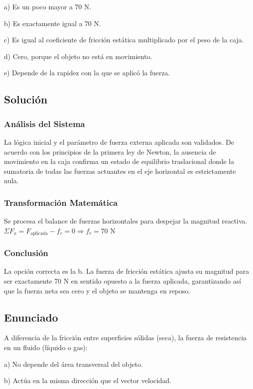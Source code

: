 \documentclass[12pt]{article}
\begin{document}
a) Es un poco mayor a 70 N.

b) Es exactamente igual a 70 N.

c) Es igual al coeficiente de fricción estática multiplicado por el peso de la caja.

d) Cero, porque el objeto no está en movimiento.

e) Depende de la rapidez con la que se aplicó la fuerza.

\subsection*{Solución}

\subsubsection*{Análisis del Sistema}
La lógica inicial y el parámetro de fuerza externa aplicada son validados. De acuerdo con los principios de la primera ley de Newton, la ausencia de movimiento en la caja confirma un estado de equilibrio traslacional donde la sumatoria de todas las fuerzas actuantes en el eje horizontal es estrictamente nula.

\subsubsection*{Transformación Matemática}
Se procesa el balance de fuerzas horizontales para despejar la magnitud reactiva.
$\Sigma F_x = F_{\text{aplicada}} - f_{r} = 0 \Rightarrow f_{r} = 70 \text{ N}$

\subsubsection*{Conclusión}
La opción correcta es la b. La fuerza de fricción estática ajusta su magnitud para ser exactamente 70 N en sentido opuesto a la fuerza aplicada, garantizando así que la fuerza neta sea cero y el objeto se mantenga en reposo.

\newpage

\subsection*{Enunciado}
A diferencia de la fricción entre superficies sólidas (seca), la fuerza de resistencia en un fluido (líquido o gas):

a) No depende del área transversal del objeto.

b) Actúa en la misma dirección que el vector velocidad.
\end{document}
